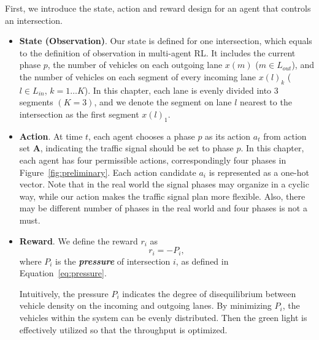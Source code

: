 First, we introduce the state, action and reward design for an agent that controls an intersection.
\begin{itemize}[wide,noitemsep,topsep=0pt]
    \item \textbf{State (Observation)}. Our state is defined for one intersection, which equals to the definition of observation in multi-agent RL. It includes the current phase $p$, the number of vehicles on each outgoing lane $x(m)$ ($m\in L_{out}$), and the number of vehicles on each segment of every incoming lane $x(l)_k$ ($l\in L_{in}$, $k=1\dots K$). In this chapter, each lane is evenly divided into 3 segments $(K=3)$, and we denote the segment on lane $l$ nearest to the intersection as the first segment $x(l)_1$.
    \item \textbf{Action}. At time $t$, each agent chooses a phase $p$ as its action $a_t$ from action set $\pmb{A}$, indicating the traffic signal should be set to phase $p$. In this chapter, each agent has four permissible actions, correspondingly four phases in Figure~\ref{fig:preliminary}. Each action candidate $a_{i}$ is represented as a one-hot vector. Note that in the real world the signal phases may organize in a cyclic way, while our action makes the traffic signal plan more flexible. Also, there may be different number of phases in the real world and four phases is not a must.
    \item \textbf{Reward}. We define the reward $r_i$ as
        \begin{equation}
            \label{eq:reward-detail}
            r_i  = - P_i,
        \end{equation}
    where $P_i$ is the  \textit{\textbf{pressure}} of intersection $i$, as defined in Equation~\eqref{eq:pressure}.
    
    Intuitively, the pressure $P_i$ indicates the degree of disequilibrium between vehicle density on the incoming and outgoing lanes. By minimizing $P_i$, the vehicles within the system can be evenly distributed. Then the green light is effectively utilized so that the throughput is optimized.
    
\end{itemize}

